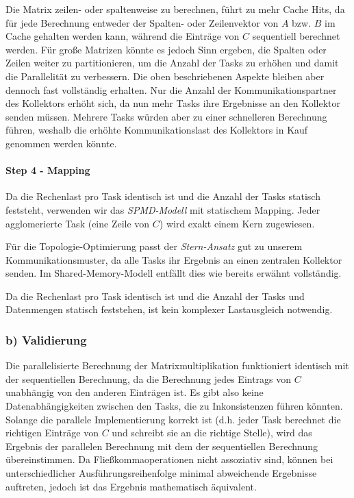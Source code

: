 Die Matrix zeilen- oder spaltenweise zu berechnen, führt zu mehr Cache Hits, da für jede Berechnung entweder der Spalten- oder Zeilenvektor von $A$ bzw. $B$ im Cache gehalten werden kann, während die Einträge von $C$ sequentiell berechnet werden.
Für große Matrizen könnte es jedoch Sinn ergeben, die Spalten oder Zeilen weiter zu partitionieren, um die Anzahl der Tasks zu erhöhen und damit die Parallelität zu verbessern. Die oben beschriebenen Aspekte bleiben aber dennoch fast vollständig erhalten. Nur die Anzahl der Kommunikationspartner des Kollektors erhöht sich, da nun mehr Tasks ihre Ergebnisse an den Kollektor senden müssen. Mehrere Tasks würden aber zu einer schnelleren Berechnung führen, weshalb die erhöhte Kommunikationslast des Kollektors in Kauf genommen werden könnte.


\paragraph{Step 4 - Mapping} Da die Rechenlast pro Task identisch ist und die Anzahl der Tasks statisch feststeht, verwenden wir das \textit{SPMD-Modell} mit statischem Mapping. Jeder agglomerierte Task (eine Zeile von $C$) wird exakt einem Kern zugewiesen.

Für die Topologie-Optimierung passt der \textit{Stern-Ansatz} gut zu unserem Kommunikationsmuster, da alle Tasks ihr Ergebnis an einen zentralen Kollektor senden. Im Shared-Memory-Modell entfällt dies wie bereits erwähnt vollständig.

Da die Rechenlast pro Task identisch ist und die Anzahl der Tasks und Datenmengen statisch feststehen, ist kein komplexer Lastausgleich notwendig.

\subsubsection*{b) Validierung}

Die parallelisierte Berechnung der Matrixmultiplikation funktioniert identisch mit der sequentiellen Berechnung, da die Berechnung jedes Eintrags von $C$ unabhängig von den anderen Einträgen ist. Es gibt also keine Datenabhängigkeiten zwischen den Tasks, die zu Inkonsistenzen führen könnten. Solange die parallele Implementierung korrekt ist (d.h. jeder Task berechnet die richtigen Einträge von $C$ und schreibt sie an die richtige Stelle), wird das Ergebnis der parallelen Berechnung mit dem der sequentiellen Berechnung übereinstimmen. Da Fließkommaoperationen nicht assoziativ sind, können bei unterschiedlicher Ausführungsreihenfolge minimal abweichende Ergebnisse auftreten, jedoch ist das Ergebnis mathematisch äquivalent.


